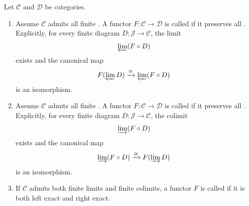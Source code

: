 \begin{definition} \label{definition:left_right_exact_functor_between_categories}
Let $\mathcal{C}$ and $\mathcal{D}$ be categories.
\begin{enumerate}
    \item Assume $\mathcal{C}$ admits all finite . A functor $F: \mathcal{C} \to \mathcal{D}$ is called  if it preserves all . Explicitly, for every finite diagram $D: \mathcal{J} \to \mathcal{C}$, the limit
    $$\varprojlim (F \circ D)$$
    exists and the canonical map
    $$ F(\varprojlim D) \xrightarrow{\cong} \varprojlim (F \circ D) $$
    is an isomorphism.
    
    \item Assume $\mathcal{C}$ admits all finite . A functor $F: \mathcal{C} \to \mathcal{D}$ is called  if it preserves all . Explicitly, for every finite diagram $D: \mathcal{J} \to \mathcal{C}$, the colimit
    $$\varinjlim (F \circ D)$$
    exists and the canonical map
    $$ \varinjlim (F \circ D) \xrightarrow{\cong} F(\varinjlim D) $$
    is an isomorphism.
    
    \item If $\mathcal{C}$ admits both finite limits and finite colimits, a functor $F$ is called  if it is both left exact and right exact.
\end{enumerate}
\end{definition}

